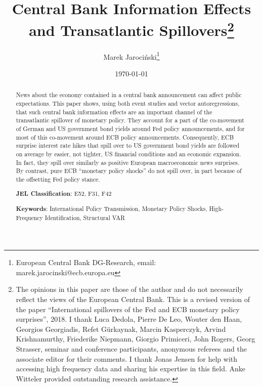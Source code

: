 \documentclass[a4paper,12pt]{article}
\begin{document}

\author{Marek Jaroci\'nski\thanks{%
European Central Bank DG-Research, email: marek.jarocinski@ecb.europa.eu}}
\title{Central Bank Information Effects and Transatlantic Spillovers\thanks{%
The opinions in this paper are
those of the author and do not necessarily reflect the views of the
European Central Bank.
This is a revised version of the paper ``International spillovers of the Fed and ECB monetary policy surprises'', 2018. I thank Luca Dedola, Pierre De Leo, Wouter den Haan, Georgios Georgiadis, Refet G\"urkaynak, Marcin Kasperczyk, Arvind Krishnamurthy, Friederike Niepmann, Giorgio Primiceri, John Rogers, Georg Strasser, seminar and conference participants, anonymous referees and the associate editor for their comments. I thank Jonas Jensen for help with accessing high frequency data and sharing his expertise in this field. Anke Witteler provided outstanding research assistance.}}
\date{\today}
\maketitle

\begin{abstract}
News about the economy contained in a central bank announcement can affect public expectations. This paper shows, using both event studies and vector autoregressions, that such central bank information effects are an important channel of the transatlantic spillover of monetary policy. They account for a part of the co-movement of German and US government bond yields around Fed policy announcements,
and for most of this co-movement around ECB policy announcements.
Consequently, ECB surprise interest rate hikes that spill over to US government bond yields are followed on average by easier, not tighter, US financial conditions and an economic expansion.
In fact, they spill over similarly as positive European macroeconomic news surprises.
By contrast, pure ECB ``monetary policy shocks'' do not spill over,
in part because of the offsetting Fed policy stance.


\bigskip

\noindent \textbf{JEL Classification}: E52, F31, F42

\noindent \textbf{Keywords}: International Policy Transmission, Monetary Policy Shocks, High-Frequency Identification, Structural VAR
\end{abstract}


\pagebreak

\setcounter{page}{1}
\end{document}
